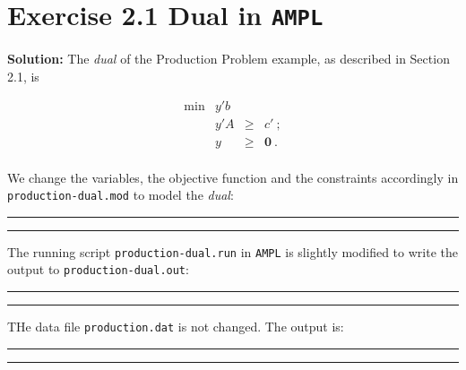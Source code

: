 \section{Exercise 2.1 Dual in {\tt AMPL}}
\textbf{Solution:}
The \emph{dual} of the Production Problem example, as described in Section 2.1, is

\[
\begin{array}{rrcl}
 \min & y'b  &  &   \\
      &  y'A  &   \geq  & c'~; \\
      &  y & \geq & \mathbf{0}~. \\
\end{array}
\]

We change the variables, the objective function and the constraints accordingly in {\tt production-dual.mod} to model the \emph{dual}:

\bigskip
\hrule
\small

\normalsize
\hrule
\bigskip

The running script {\tt production-dual.run} in {\tt AMPL} is slightly modified to write the output to {\tt production-dual.out}:

\bigskip
\hrule
\small

\normalsize
\hrule
\bigskip

THe data file {\tt production.dat} is not changed. The output is:

\bigskip
\hrule
\small

\normalsize
\hrule
\bigskip
